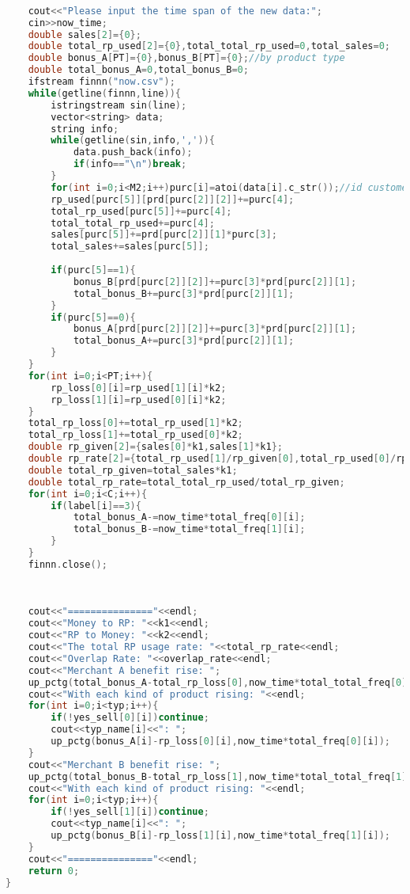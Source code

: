 \begin{lstlisting}[language=C++]
	
	
	cout<<"Please input the time span of the new data:";
	cin>>now_time;
	double sales[2]={0};
	double total_rp_used[2]={0},total_total_rp_used=0,total_sales=0;
	double bonus_A[PT]={0},bonus_B[PT]={0};//by product type
	double total_bonus_A=0,total_bonus_B=0;
	ifstream finnn("now.csv");
	while(getline(finnn,line)){
		istringstream sin(line);
		vector<string> data;
		string info;
		while(getline(sin,info,',')){
			data.push_back(info);
			if(info=="\n")break;
		}
		for(int i=0;i<M2;i++)purc[i]=atoi(data[i].c_str());//id customer_id product_id amount use_rp shop(0A1B)
		rp_used[purc[5]][prd[purc[2]][2]]+=purc[4];
		total_rp_used[purc[5]]+=purc[4];
		total_total_rp_used+=purc[4];
		sales[purc[5]]+=prd[purc[2]][1]*purc[3];
		total_sales+=sales[purc[5]];
		
		if(purc[5]==1){
			bonus_B[prd[purc[2]][2]]+=purc[3]*prd[purc[2]][1];
			total_bonus_B+=purc[3]*prd[purc[2]][1];
		}
		if(purc[5]==0){
			bonus_A[prd[purc[2]][2]]+=purc[3]*prd[purc[2]][1];
			total_bonus_A+=purc[3]*prd[purc[2]][1];
		}
	}
	for(int i=0;i<PT;i++){
		rp_loss[0][i]=rp_used[1][i]*k2;
		rp_loss[1][i]=rp_used[0][i]*k2;
	}
	total_rp_loss[0]+=total_rp_used[1]*k2;
	total_rp_loss[1]+=total_rp_used[0]*k2;
	double rp_given[2]={sales[0]*k1,sales[1]*k1};
	double rp_rate[2]={total_rp_used[1]/rp_given[0],total_rp_used[0]/rp_given[1]};
	double total_rp_given=total_sales*k1;
	double total_rp_rate=total_total_rp_used/total_rp_given;
	for(int i=0;i<C;i++){
		if(label[i]==3){
			total_bonus_A-=now_time*total_freq[0][i];
			total_bonus_B-=now_time*total_freq[1][i];
		}
	}
	finnn.close();
	
	
	
	cout<<"==============="<<endl;
	cout<<"Money to RP: "<<k1<<endl;
	cout<<"RP to Money: "<<k2<<endl;
	cout<<"The total RP usage rate: "<<total_rp_rate<<endl;
	cout<<"Overlap Rate: "<<overlap_rate<<endl; 
	cout<<"Merchant A benefit rise: ";
	up_pctg(total_bonus_A-total_rp_loss[0],now_time*total_total_freq[0]);
	cout<<"With each kind of product rising: "<<endl;
	for(int i=0;i<typ;i++){
		if(!yes_sell[0][i])continue;
		cout<<typ_name[i]<<": ";
		up_pctg(bonus_A[i]-rp_loss[0][i],now_time*total_freq[0][i]);
	}
	cout<<"Merchant B benefit rise: ";
	up_pctg(total_bonus_B-total_rp_loss[1],now_time*total_total_freq[1]);
	cout<<"With each kind of product rising: "<<endl;
	for(int i=0;i<typ;i++){
		if(!yes_sell[1][i])continue;
		cout<<typ_name[i]<<": ";
		up_pctg(bonus_B[i]-rp_loss[1][i],now_time*total_freq[1][i]);
	}
	cout<<"==============="<<endl;
	return 0;
}
\end{lstlisting}
